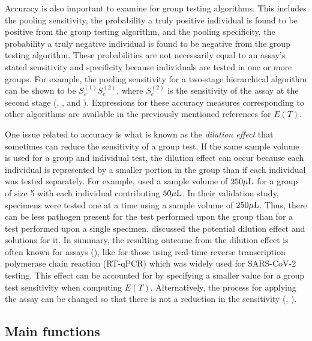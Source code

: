Accuracy is also important to examine for group testing algorithms.
This includes the pooling sensitivity, the probability a truly positive
individual is found to be positive from the group testing algorithm,
and the pooling specificity, the probability a truly negative individual
is found to be negative from the group testing algorithm. These probabilities
are not necessarily equal to an assay's stated sensitivity and specificity
because individuals are tested in one or more groups. For example,
the pooling sensitivity for a two-stage hierarchical algorithm can
be shown to be $S_{e}^{(1)}S_{e}^{(2)}$, where $S_{e}^{(2)}$ is
the sensitivity of the assay at the second stage (\citealt{johnson1991inspection},
\citealt{Kim2007}, and \citealt{hitt2020group1}). Expressions for
these accuracy measures corresponding to other algorithms are available
in the previously mentioned references for $E(T)$. 

One issue related to accuracy is what is known as the \emph{dilution
effect} that sometimes can reduce the sensitivity of a group test.
If the same sample volume is used for a group and individual
test, the dilution effect can occur because each individual is represented
by a smaller portion in the group than if each individual was tested
separately. For example, \citet{abdalhamid2020assessment} used a
sample volume of $250\textrm{\ensuremath{\mu}L}$ for a group of size
5 with each individual contributing $50\textrm{\ensuremath{\mu}L}$.
In their validation study, specimens were tested one at a time using
a sample volume of $250\textrm{\ensuremath{\mu}L}$. Thus, there can
be less pathogen present for the test performed upon the group than
for a test performed upon a single specimen. \citet{bilder2021discussion}
discussed the potential dilution effect and solutions for it. In summary,
the resulting outcome from the dilution effect is often known for
assays (\citealt{tan2020considerations}), like for those using real-time
reverse transcription polymerase chain reaction (RT-qPCR) which was
widely used for SARS-CoV-2 testing. This effect can be accounted for
by specifying a smaller value for a group test sensitivity when computing
$E(T)$. Alternatively, the process for applying the assay can be
changed so that there is not a reduction in the sensitivity (\citealt{abdalhamid2020assessment},
\citealt{sanghani2021concentrating}).

\subsection{Main functions}

